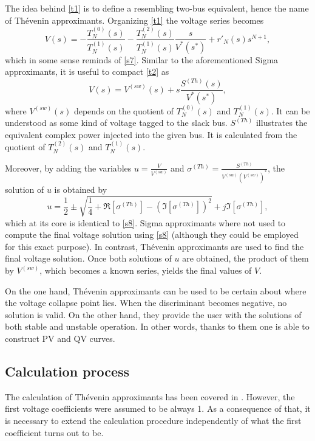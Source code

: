 \documentclass[journal]{IEEEtran}
\begin{document}
The idea behind \eqref{t1} is to define a resembling two-bus equivalent, hence the name of Thévenin approximants. Organizing \eqref{t1} the voltage series becomes
\begin{equation}
  V(s)=-\frac{T^{(0)}_N(s)}{T^{(1)}_N(s)}-\frac{T^{(2)}_N(s)}{T^{(1)}_N(s)}\frac{s}{V^*(s^*)}+r'_N(s)s^{N+1},
  \label{t2}
\end{equation}
which in some sense reminds of \eqref{s7}. Similar to the aforementioned Sigma approximants, it is useful to compact \eqref{t2} as
\begin{equation}
  V(s)=V^{(sw)}(s)+s\frac{S^{(Th)}(s)}{V^*(s^*)},
  \label{t3}
\end{equation}
where $V^{(sw)}(s)$ depends on the quotient of $T^{(0)}_N(s)$ and $T^{(1)}_N(s)$. It can be understood as some kind of voltage tagged to the slack bus. $S^{(Th)}$ illustrates the equivalent complex power injected into the given bus. It is calculated from the quotient of $T^{(2)}_N(s)$ and $T^{(1)}_N(s)$. 

Moreover, by adding the variables $u=\frac{V}{V^{(sw)}}$ and $\sigma^{(Th)}=\frac{S^{(Th)}}{V^{(sw)}(V^{(sw)})^*}$, the solution of $u$ is obtained by
\begin{equation}
  u=\frac{1}{2}\pm \sqrt{\frac{1}{4} + \Re[\sigma^{(Th)}]-(\Im[\sigma^{(Th)}])^2}+j\Im[\sigma^{(Th)}],
  \label{t4}
\end{equation}
which at its core is identical to \eqref{s8}. Sigma approximants where not used to compute the final voltage solution using \eqref{s8} (although they could be employed for this exact purpose). In contrast, Thévenin approximants are used to find the final voltage solution. Once both solutions of $u$ are obtained, the product of them by $V^{(sw)}$, which becomes a known series, yields the final values of $V$. 

On the one hand, Thévenin approximants can be used to be certain about where the voltage collapse point lies. When the discriminant becomes negative, no solution is valid. On the other hand, they provide the user with the solutions of both stable and unstable operation. In other words, thanks to them one is able to construct PV and QV curves.
\subsection{Calculation process}
The calculation of Thévenin approximants has been covered in \cite{Trias2018}. However, the first voltage coefficients were assumed to be always 1. As a consequence of that, it is necessary to extend the calculation procedure independently of what the first coefficient turns out to be.
\end{document}
